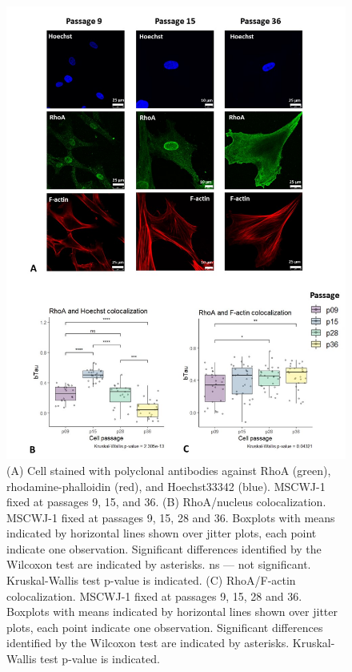 \documentclass[alpha-refs]{wiley-article}
\begin{document}
\begin{figure}[hbt!]
  \includegraphics[width=0.9\linewidth]{rho.jpg}
  \caption{(A) Cell stained with polyclonal antibodies against RhoA (green), rhodamine-phalloidin (red), and Hoechst33342 (blue). MSCWJ-1 fixed at passages 9, 15, and 36. (B) RhoA/nucleus colocalization. MSCWJ-1 fixed at passages 9, 15, 28 and 36. Boxplots with means indicated by horizontal lines shown over jitter plots, each point indicate one observation. Significant differences identified by the Wilcoxon test are indicated by asterisks. ns --- not significant. Kruskal-Wallis test p-value is indicated. (C) RhoA/F-actin colocalization. MSCWJ-1 fixed at passages 9, 15, 28 and 36. Boxplots with means indicated by horizontal lines shown over jitter plots, each point indicate one observation. Significant differences identified by the Wilcoxon test are indicated by asterisks. Kruskal-Wallis test p-value is indicated.}
  \centering
\end{figure}
\end{document}
